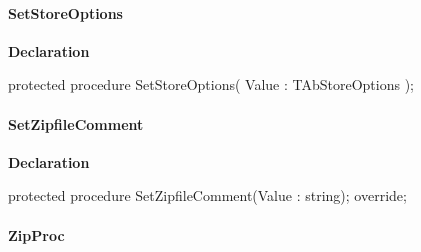 \documentclass{report}
\newif\ifpdf
\begin{document}
\paragraph*{SetStoreOptions}\hspace*{\fill}

\label{AbZipper.TAbCustomZipper-SetStoreOptions}
\begin{list}{}{
\setlength{\itemindent}{0cm}
\setlength{\listparindent}{0cm}
\setlength{\leftmargin}{\evensidemargin}
\addtolength{\leftmargin}{\tmplength}
\settowidth{\labelsep}{X}
\addtolength{\leftmargin}{\labelsep}
\setlength{\labelwidth}{\tmplength}
}
\item[\textbf{Declaration}\hfill]
\ifpdf
\begin{flushleft}
\fi
\begin{ttfamily}
protected procedure SetStoreOptions( Value : TAbStoreOptions );\end{ttfamily}

\ifpdf
\end{flushleft}
\fi

\end{list}
\paragraph*{SetZipfileComment}\hspace*{\fill}

\label{AbZipper.TAbCustomZipper-SetZipfileComment}
\begin{list}{}{
\setlength{\itemindent}{0cm}
\setlength{\listparindent}{0cm}
\setlength{\leftmargin}{\evensidemargin}
\addtolength{\leftmargin}{\tmplength}
\settowidth{\labelsep}{X}
\addtolength{\leftmargin}{\labelsep}
\setlength{\labelwidth}{\tmplength}
}
\item[\textbf{Declaration}\hfill]
\ifpdf
\begin{flushleft}
\fi
\begin{ttfamily}
protected procedure SetZipfileComment(Value : string); override;\end{ttfamily}

\ifpdf
\end{flushleft}
\fi

\end{list}
\paragraph*{ZipProc}\hspace*{\fill}
\end{document}
